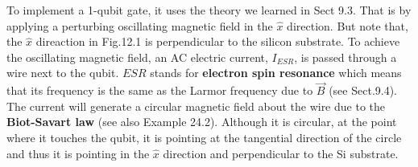 \documentclass{article}
\begin{document}
To implement a 1-qubit gate, it uses the theory we learned in Sect 9.3. That is by applying a perturbing oscillating
magnetic field in the $\hat{x}$ direction. But note that, the $\hat{x}$ direaction in Fig.12.1 is perpendicular to the silicon substrate.
To achieve the oscillating magnetic field, an AC electric current, $I_{ESR}$, is passed through
a wire next to the qubit. $ESR$ stands for \textbf{electron spin resonance} which means that its
frequency is the same as the Larmor frequency due to $\vec{B}$ (see Sect.9.4). The current will generate a circular
magnetic field about the wire due to the \textbf{Biot-Savart law} (see
also Example 24.2). Although it is circular, at the point where it touches the qubit, it is pointing
at the tangential direction of the circle and thus it is pointing in the $\hat{x}$ direction and perpendicular
to the Si substrate. 

\printbibliography
\end{document}
